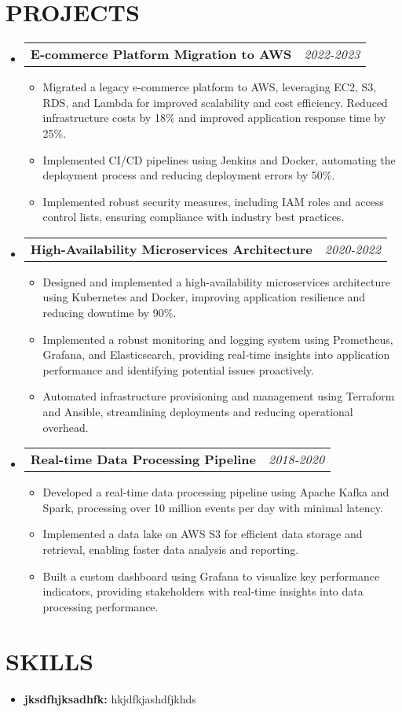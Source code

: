 \documentclass[letterpaper,11pt]{article}
\makeatletter
\newcommand{\resumeItem}[1]{\item\small{{#1 \vspace{-3pt}}}}
\newcommand{\resumeProjectHeading}[2]{\item\begin{tabular*}{0.97\textwidth}{l@{\extracolsep{\fill}}r}\small#1 & #2 \\\end{tabular*}\vspace{-7pt}}
\newcommand{\resumeSubHeadingListStart}{\begin{itemize}[leftmargin=0.15in, label={}]}
\newcommand{\resumeSubHeadingListEnd}{\end{itemize}}
\newcommand{\resumeItemListStart}{\begin{itemize}}
\newcommand{\resumeItemListEnd}{\end{itemize}\vspace{-5pt}}
\makeatother
\begin{document}
\section{{\fontsize{9pt}{20pt}\selectfont \textbf{PROJECTS}}}\resumeSubHeadingListStart
\resumeProjectHeading{\textbf{E-commerce Platform Migration to AWS}}{\textit{2022-2023}}
\resumeItemListStart
\resumeItem{Migrated a legacy e-commerce platform to AWS, leveraging EC2, S3, RDS, and Lambda for improved scalability and cost efficiency. Reduced infrastructure costs by 18\% and improved application response time by 25\%.}
\resumeItem{Implemented CI/CD pipelines using Jenkins and Docker, automating the deployment process and reducing deployment errors by 50\%.}
\resumeItem{Implemented robust security measures, including IAM roles and access control lists, ensuring compliance with industry best practices.}
\resumeItemListEnd\vspace{-6pt}
\resumeProjectHeading{\textbf{High-Availability Microservices Architecture}}{\textit{2020-2022}}
\resumeItemListStart
\resumeItem{Designed and implemented a high-availability microservices architecture using Kubernetes and Docker, improving application resilience and reducing downtime by 90\%.}
\resumeItem{Implemented a robust monitoring and logging system using Prometheus, Grafana, and Elasticsearch, providing real-time insights into application performance and identifying potential issues proactively.}
\resumeItem{Automated infrastructure provisioning and management using Terraform and Ansible, streamlining deployments and reducing operational overhead.}
\resumeItemListEnd\vspace{-6pt}
\resumeProjectHeading{\textbf{Real-time Data Processing Pipeline}}{\textit{2018-2020}}
\resumeItemListStart
\resumeItem{Developed a real-time data processing pipeline using Apache Kafka and Spark, processing over 10 million events per day with minimal latency.}
\resumeItem{Implemented a data lake on AWS S3 for efficient data storage and retrieval, enabling faster data analysis and reporting.}
\resumeItem{Built a custom dashboard using Grafana to visualize key performance indicators, providing stakeholders with real-time insights into data processing performance.}
\resumeItemListEnd
\resumeSubHeadingListEnd\vspace{-17pt}
\section{{\fontsize{9pt}{20pt}\selectfont \textbf{SKILLS}}}\resumeSubHeadingListStart
\resumeItem{\textbf{jksdfhjksadhfk:} hkjdfkjashdfjkhds}
\resumeSubHeadingListEnd\vspace{-10pt}
\end{document}
